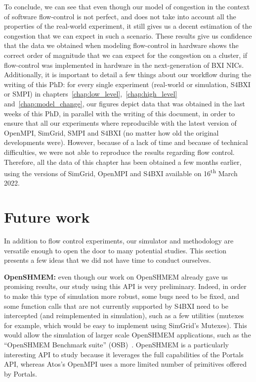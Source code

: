 \smallskip

To conclude, we can see that even though our model of congestion in the context
of software flow-control is not perfect, and does not take into account all the
properties of the real-world experiment, it still gives us a decent estimation
of the congestion that we can expect in such a scenario. These results give us
confidence that the data we obtained when modeling flow-control in hardware
shows the correct order of magnitude that we can expect for the congestion on a
cluster, if flow-control was implemented in hardware in the next-generation of
BXI NICs. Additionally, it is important to detail a few things about our
workflow during the writing of this PhD: for every single experiment (real-world
or simulation, S4BXI or SMPI) in
chapters~\ref{chap:low_level},~\ref{chap:high_level}
and~\ref{chap:model_change}, our figures depict data that was obtained in the
last weeks of this PhD, in parallel with the writing of this document, in order
to ensure that all our experiments where reproducible with the latest version of
OpenMPI, SimGrid, SMPI and S4BXI (no matter how old the original developments
were). However, because of a lack of time and because of technical difficulties,
we were not able to reproduce the results regarding flow control. Therefore, all
the data of this chapter has been obtained a few months earlier, using the
versions of SimGrid, OpenMPI and S4BXI available on 16\textsuperscript{th} March
2022.

\section{Future work}

In addition to flow control experiments, our simulator and methodology are
versatile enough to open the door to many potential studies. This section
presents a few ideas that we did not have time to conduct ourselves.

\bigskip

\textbf{OpenSHMEM:} even though our work on OpenSHMEM already gave us promising
results, our study using this API is very preliminary. Indeed, in order to make
this type of simulation more robust, some bugs need to be fixed, and some
function calls that are not currently supported by S4BXI need to be intercepted
(and reimplemented in simulation), such as a few  utilities
(mutexes for example, which would be easy to implement using SimGrid's Mutexes).
This would allow the simulation of larger scale OpenSHMEM applications, such as
the ``OpenSHMEM Benchmark suite'' (OSB)~\cite{OSB}. OpenSHMEM is a particularly
interesting API to study because it leverages the full capabilities of the
Portals API, whereas Atos's OpenMPI uses a more limited number of primitives
offered by Portals.


